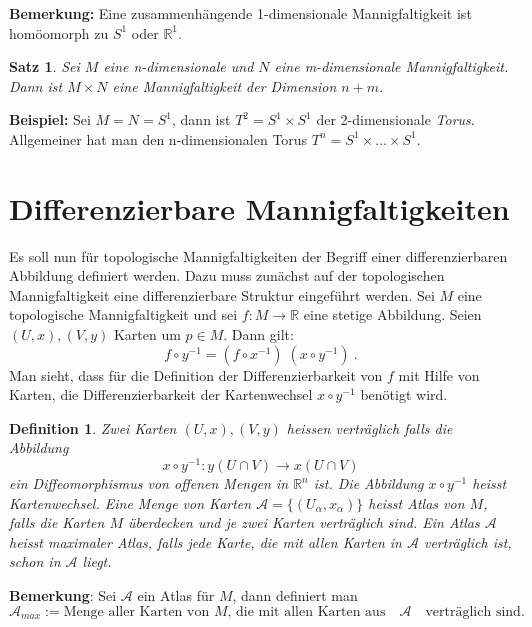 \documentclass[12pt,a4paper]{article}
\def\R{\mathbb{R}}
\newtheorem{Satz}[Lemma]{Satz}
\newtheorem{Definition}[Lemma]{Definition}
\begin{document}
\medskip

{\bf Bemerkung:} Eine zusammenh\"angende 1-dimensionale Mannigfaltigkeit ist hom\"oomorph zu $S^1$ oder $\R^1$.

\bigskip

\begin{Satz} Sei $M$ eine n-dimensionale und $N$ eine m-dimensionale Mannigfaltigkeit. Dann ist $M\times N$
eine Mannigfaltigkeit der Dimension $n+m$.
\end{Satz}

\medskip

{\bf Beispiel:} Sei $M=N=S^1$, dann ist $T^2= S^1 \times S^1$ der 2-dimensionale {\it Torus}. Allgemeiner
hat man den n-dimensionalen Torus $T^n = S^1 \times \ldots \times S^1$.


\section{Differenzierbare Mannigfaltigkeiten}

Es soll nun f\"ur topologische Mannigfaltigkeiten der Begriff einer differenzierbaren Abbildung definiert werden.
Dazu muss zun\"achst auf der topologischen Mannigfaltigkeit eine differenzierbare Struktur eingef\"uhrt werden. Sei
$M$ eine topologische Mannigfaltigkeit und sei $f:M \rightarrow \R$ eine stetige Abbildung. Seien $(U,x), (V,y)$
Karten um $p\in M$. Dann gilt:
$$
f \circ y^{-1} = (f\circ x^{-1}) \; (x\circ y^{-1}) \ .
$$
Man sieht, dass f\"ur die Definition der Differenzierbarkeit von $f$ mit Hilfe von Karten, die Differenzierbarkeit
der Kartenwechsel $x\circ y^{-1}$ ben\"otigt wird.

\medskip

\begin{Definition}
Zwei Karten $(U,x), (V,y)$ heissen {\em vertr\"aglich} falls die Abbildung
$$
x\circ y^{-1} : y(U \cap V) \rightarrow x(U\cap V)
$$
ein Diffeomorphismus von offenen Mengen in $\R^n$ ist. Die Abbildung $x\circ y^{-1}$ heisst {\em Kartenwechsel}.
Eine Menge von Karten $\mathcal A = \{(U_\alpha, x_\alpha)\}$ heisst {\em Atlas} von $M$, falls die Karten $M$
\"uberdecken und je zwei Karten vertr\"aglich sind.
Ein Atlas $\mathcal A$ heisst {\em maximaler Atlas}, falls jede Karte, die mit allen Karten in $\mathcal A$
vertr\"aglich ist, schon in $\mathcal A$ liegt.
\end{Definition}

{\bf Bemerkung}: Sei $\mathcal A$ ein Atlas f\"ur $M$, dann definiert man
$$
\mathcal A_{max} := \mbox{Menge aller Karten von $M$, die mit allen Karten aus} \quad \mathcal A \quad \mbox{vertr\"aglich sind}.
$$
\end{document}
